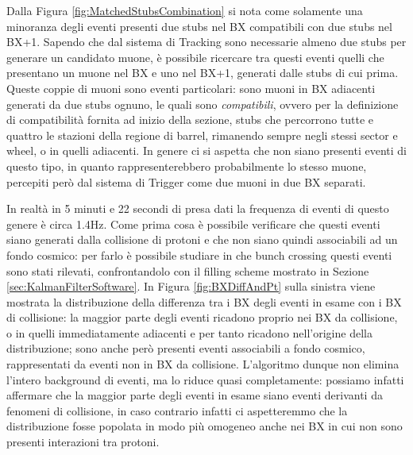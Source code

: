 Dalla Figura \ref{fig:MatchedStubsCombination} si nota come solamente una minoranza degli eventi presenti due stubs nel BX compatibili con due stubs nel BX+1. Sapendo che dal sistema di Tracking sono necessarie almeno due stubs per generare un candidato muone, è possibile ricercare tra questi eventi quelli che presentano un muone nel BX e uno nel BX+1, generati dalle stubs di cui prima. \newline
Queste coppie di muoni sono eventi particolari: sono muoni in BX adiacenti generati da due stubs ognuno, le quali sono \textit{compatibili}, ovvero per la definizione di compatibilità fornita ad inizio della sezione, stubs che percorrono tutte e quattro le stazioni della regione di barrel, rimanendo sempre negli stessi sector e wheel, o in quelli adiacenti. In genere ci si aspetta che non siano presenti eventi di questo tipo, in quanto rappresenterebbero probabilmente lo stesso muone, percepiti però dal sistema di Trigger come due muoni in due BX separati.

In realtà in 5 minuti e 22 secondi di presa dati la frequenza di eventi di questo genere è circa 1.4Hz. Come prima cosa è possibile verificare che questi eventi siano generati dalla collisione di protoni e che non siano quindi associabili ad un fondo cosmico: per farlo è possibile studiare in che bunch crossing questi eventi sono stati rilevati, confrontandolo con il filling scheme mostrato in Sezione \ref{sec:KalmanFilterSoftware}. In Figura \ref{fig:BXDiffAndPt} sulla sinistra viene mostrata la distribuzione della differenza tra i BX degli eventi in esame con i BX di collisione: la maggior parte degli eventi ricadono proprio nei BX da collisione, o in quelli immediatamente adiacenti e per tanto ricadono nell'origine della distribuzione; sono anche però presenti eventi associabili a fondo cosmico, rappresentati da eventi non in BX da collisione. L'algoritmo dunque non elimina l'intero background di eventi, ma lo riduce quasi completamente: possiamo infatti affermare che la maggior parte degli eventi in esame siano eventi derivanti da fenomeni di collisione, in caso contrario infatti ci aspetteremmo che la distribuzione fosse popolata in modo più omogeneo anche nei BX in cui non sono presenti interazioni tra protoni.

